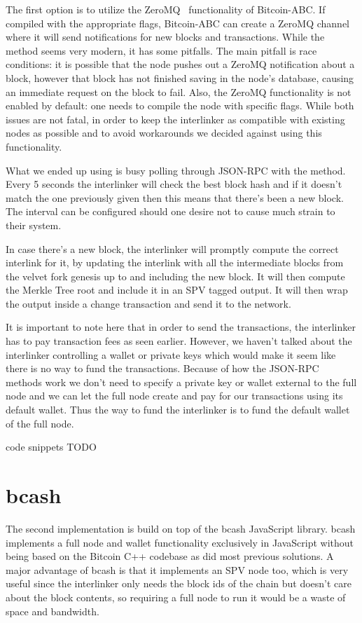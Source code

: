The first option is to utilize the ZeroMQ~\cite{zmq} functionality of Bitcoin-ABC. If compiled with the appropriate flags, Bitcoin-ABC can create a ZeroMQ channel where it will send notifications for new blocks and transactions. While the method seems very modern, it has some pitfalls. The main pitfall is race conditions: it is possible that the node pushes out a ZeroMQ notification about a block, however that block has not finished saving in the node's database, causing an immediate  request on the block to fail. Also, the ZeroMQ functionality is not enabled by default: one needs to compile the node with specific flags. While both issues are not fatal, in order to keep the interlinker as compatible with existing nodes as possible and to avoid workarounds we decided against using this functionality.

What we ended up using is busy polling through JSON-RPC with the  method. Every 5 seconds the interlinker will check the best block hash and if it doesn't match the one previously given then this means that there's been a new block. The interval can be configured should one desire not to cause much strain to their system.

In case there's a new block, the interlinker will promptly compute the correct interlink for it, by updating the interlink with all the intermediate blocks from the velvet fork genesis up to and including the new block. It will then compute the Merkle Tree root and include it in an SPV tagged output. It will then wrap the output inside a change transaction and send it to the network.

It is important to note here that in order to send the transactions, the interlinker has to pay transaction fees as seen earlier. However, we haven't talked about the interlinker controlling a wallet or private keys which would make it seem like there is no way to fund the transactions. Because of how the JSON-RPC methods work we don't need to specify a private key or wallet external to the full node and we can let the full node create and pay for our transactions using its default wallet. Thus the way to fund the interlinker is to fund the default wallet of the full node.

code snippets TODO

\section{bcash}
The second implementation is build on top of the bcash JavaScript library. bcash implements a full node and wallet functionality exclusively in JavaScript without being based on the Bitcoin C++ codebase as did most previous solutions. A major advantage of bcash is that it implements an SPV node too, which is very useful since the interlinker only needs the block ids of the chain but doesn't care about the block contents, so requiring a full node to run it would be a waste of space and bandwidth.

